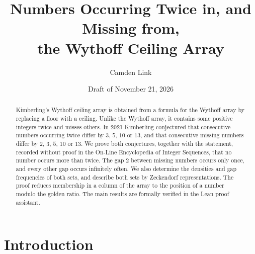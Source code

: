 \documentclass[12pt]{article}
\title{Numbers Occurring Twice in, and Missing from,\\ the Wythoff Ceiling Array}
\author{Camden Link}
\date{Draft of November 21, 2026}
\theoremstyle{plain}
\theoremstyle{remark}
\begin{document}
\maketitle

\begin{abstract}
Kimberling's Wythoff ceiling array is obtained from a formula for the Wythoff array by
replacing a floor with a ceiling. Unlike the Wythoff array, it contains some positive integers
twice and misses others. In 2021 Kimberling conjectured that consecutive numbers occurring twice
differ by $3$, $5$, $10$ or $13$, and that consecutive missing numbers differ by $2$, $3$, $5$,
$10$ or $13$. We prove both conjectures, together with the statement, recorded without proof in
the On-Line Encyclopedia of Integer Sequences, that no number occurs more than twice. The gap $2$
between missing numbers occurs only once, and every other gap occurs infinitely often. We also
determine the densities and gap frequencies of both sets, and describe both sets by Zeckendorf
representations. The proof reduces membership in a column of the array to the position of a
number modulo the golden ratio. The main results are formally verified in the Lean proof
assistant.
\end{abstract}

\section{Introduction}
\end{document}
